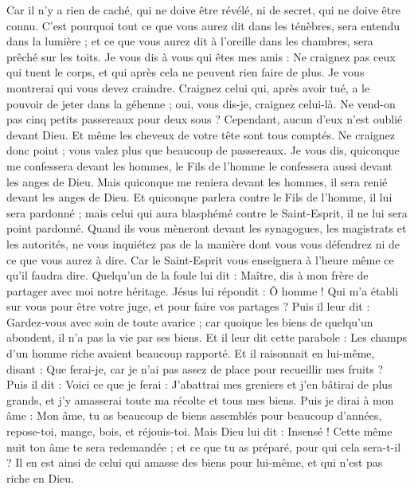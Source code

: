 \begin{multicols}{2}
{Car il n'y a rien de caché, qui ne doive être révélé, ni de secret, qui ne doive être connu.
C'est pourquoi tout ce que vous aurez dit dans les ténèbres, sera entendu dans la lumière ; et ce que vous aurez dit à l'oreille dans les chambres, sera prêché sur les toits.
Je vous dis à vous qui êtes mes amis : Ne craignez pas ceux qui tuent le corps, et qui après cela ne peuvent rien faire de plus.
Je vous montrerai qui vous devez craindre. Craignez celui qui, après avoir tué, a le pouvoir de jeter dans la géhenne ; oui, vous dis-je, craignez celui-là.
Ne vend-on pas cinq petits passereaux pour deux sous ? Cependant, aucun d’eux n'est oublié devant Dieu.
Et même les cheveux de votre tête sont tous comptés. Ne craignez donc point ; vous valez plus que beaucoup de passereaux.
Je vous dis, quiconque me confessera devant les hommes, le Fils de l'homme le confessera aussi devant les anges de Dieu.
Mais quiconque me reniera devant les hommes, il sera renié devant les anges de Dieu.
Et quiconque parlera contre le Fils de l'homme, il lui sera pardonné ; mais celui qui aura blasphémé contre le Saint-Esprit, il ne lui sera point pardonné.
Quand ils vous mèneront devant les synagogues, les magistrats et les autorités, ne vous inquiétez pas de la manière dont vous vous défendrez ni de ce que vous aurez à dire.
Car le Saint-Esprit vous enseignera à l’heure même ce qu'il faudra dire.
Quelqu'un de la foule lui dit : Maître, dis à mon frère de partager avec moi notre héritage.
Jésus lui répondit : Ô homme ! Qui m'a établi sur vous pour être votre juge, et pour faire vos partages ?
Puis il leur dit : Gardez-vous avec soin de toute avarice ; car quoique les biens de quelqu’un abondent, il n’a pas la vie par ses biens.
Et il leur dit cette parabole : Les champs d'un homme riche avaient beaucoup rapporté.
Et il raisonnait en lui-même, disant : Que ferai-je, car je n'ai pas assez de place pour recueillir mes fruits ?
Puis il dit : Voici ce que je ferai : J'abattrai mes greniers et j'en bâtirai de plus grands, et j'y amasserai toute ma récolte et tous mes biens.
Puis je dirai à mon âme : Mon âme, tu as beaucoup de biens assemblés pour beaucoup d'années, repose-toi, mange, bois, et réjouis-toi.
Mais Dieu lui dit : Insensé ! Cette même nuit ton âme te sera redemandée ; et ce que tu as préparé, pour qui cela sera-t-il ?
Il en est ainsi de celui qui amasse des biens pour lui-même, et qui n'est pas riche en Dieu.
}
\end{multicols}
